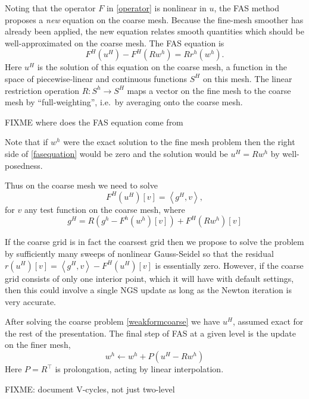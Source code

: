 \documentclass[letterpaper,final,12pt,reqno]{amsart}
\newcommand{\ip}[2]{\left<#1,#2\right>}
\begin{document}
Noting that the operator $F$ in \eqref{operator} is nonlinear in $u$, the FAS method  proposes a \emph{new} equation on the coarse mesh.  Because the fine-mesh smoother has already been applied, the new equation relates smooth quantities which should be well-approximated on the coarse mesh.  The FAS equation is
\begin{equation}
  F^H(u^H) - F^H(R w^h) = R r^h(w^h). \label{fasequation}
\end{equation}
Here $u^H$ is the solution of this equation on the coarse mesh, a function in the space of piecewise-linear and continuous functions $S^H$ on this mesh.  The linear restriction operation $R:S^h \to S^H$ maps a vector on the fine mesh to the coarse mesh by ``full-weighting'', i.e.~by averaging onto the coarse mesh.

FIXME where does the FAS equation come from

Note that if $w^h$ were the exact solution to the fine mesh problem then the right side of \eqref{fasequation} would be zero and the solution would be $u^H = R w^h$ by well-posedness.

Thus on the coarse mesh we need to solve
\begin{equation}
  F^H(u^H)[v] = \ip{g^H}{v},  \label{weakformcoarse}
\end{equation}
for $v$ any test function on the coarse mesh, where
  $$g^H = R (g^h - F^h(w^h)[v]) + F^H(R w^h)[v]$$

If the coarse grid is in fact the coarsest grid then we propose to solve the problem by sufficiently many sweeps of nonlinear Gauss-Seidel so that the residual $r(u^H)[v] = \ip{g^H}{v} - F^H(u^H)[v]$ is essentially zero.  However, if the coarse grid consists of only one interior point, which it will have with default settings, then this could involve a single NGS update as long as the Newton iteration is very accurate.

After solving the coarse problem \eqref{weakformcoarse} we have $u^H$, assumed exact for the rest of the presentation.  The final step of FAS at a given level is the update on the finer mesh,
\begin{equation}
  w^h \longleftarrow w^h + P(u^H - R w^h) \label{fasupdate}
\end{equation}
Here $P=R^\top$ is prolongation, acting by linear interpolation.

FIXME: document V-cycles, not just two-level

\small

\bigskip


\end{document}
